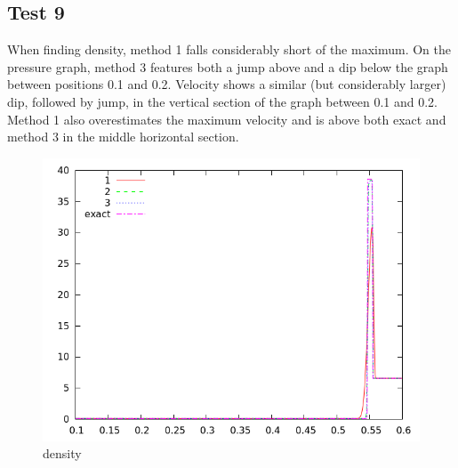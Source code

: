 \documentclass[letterpaper,12pt]{article}
\begin{document}
\clearpage

\subsection{Test 9}
When finding density, method 1 falls considerably short of the maximum. On the pressure graph, method 3 features both a jump above and a dip below the graph between positions 0.1 and 0.2. Velocity shows a similar (but considerably larger) dip, followed by jump, in the vertical section of the graph between 0.1 and 0.2. Method 1 also overestimates the maximum velocity and is above both exact and method 3 in the middle horizontal section. 


\begin{figure}[h]
  \begin{center}
     \includegraphics[width=.78\textwidth]{den_T9.png}	
  \end{center}
  \caption{density}
\end{figure}
\end{document}
